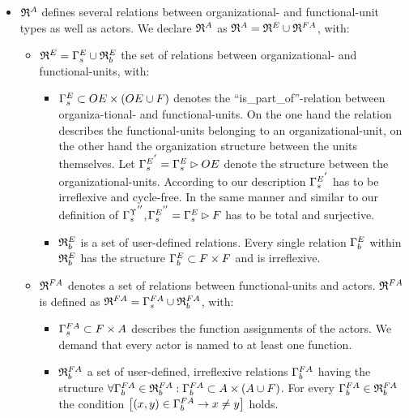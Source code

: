 \begin{itemize}
\begin{itemize}
	\end{itemize}	
	\item ${\mathfrak{R}}^{A}$ defines several relations between organizational- and functional-unit types as well as actors. We declare ${\mathfrak{R}}^{A}$ as 		$\relmengeinst = \relmengeinstOE_F \cup \relmengeinstFA$, with:

		\begin{itemize}

		\item $\relmengeinstOE_F = \relstrukturOE_F \cup \relmengebenutzerinstOE_F$ the set of relations between organizational- and functional-units, with:
			\begin{itemize}
			\item $\relstrukturOE_F \subset \oe \times (\oe \cup \f)$ denotes the ``is\_part\_of''-relation between organiza-tional- and functional-units. On the one hand the relation describes the functional-units belonging to an organizational-unit, on the other hand the organization structure between the units themselves. Let ${\relstrukturOE_F}^{'} = \relstrukturOE_F \rhd \oe$ denote the structure between the organizational-units. According to our description ${\relstrukturOE_F}^{'}$ has to be irreflexive and cycle-free. In the same manner and similar to our definition of ${{\Gamma}^{\Upsilon}_{s}}^{''}$,${\relstrukturOE_F}^{''} = \relstrukturOE_F \rhd \f$ has to be total and surjective.

			\item $\relmengebenutzerinstOE_F$ is a set of user-defined relations. Every single relation ${\relbenutzerinstOE_F}$ within $\relmengebenutzerinstOE_F$ has the structure ${\relbenutzerinstOE_F} \subset \f \times \f$ and is irreflexive. 
			\end{itemize}

		\item ${\mathfrak{R}}^{FA}$ denotes a set of relations between functional-units and actors. ${\mathfrak{R}}^{FA}$ is defined as ${\mathfrak{R}}^{FA} = {\Gamma}^{FA}_{s} \cup {\mathfrak{R}}^{FA}_{b}$, with:

			\begin{itemize}

			\item ${\Gamma}^{FA}_{s} \subset F \times A$ describes the function assignments of the actors. We demand that every actor is named to at least one function. 

			\item ${\mathfrak{R}}^{FA}_{b}$ a set of user-defined, irreflexive relations 	${{\Gamma}^{FA}_{b}}$ having the structure $\forall {{\Gamma}^{FA}_{b}} \in {\mathfrak{R}}^{FA}_{b}: {{\Gamma}^{FA}_{b}} \subset A \times (A \cup F)$. For every ${\Gamma}^{FA}_{b} \in {\mathfrak{R}}^{FA}_{b}$ the condition		$\left[(x,y) \in {\Gamma}^{FA}_{b} \rightarrow x \neq y \right]$ holds. 
			\end{itemize}

		\end{itemize}

	\end{itemize}

